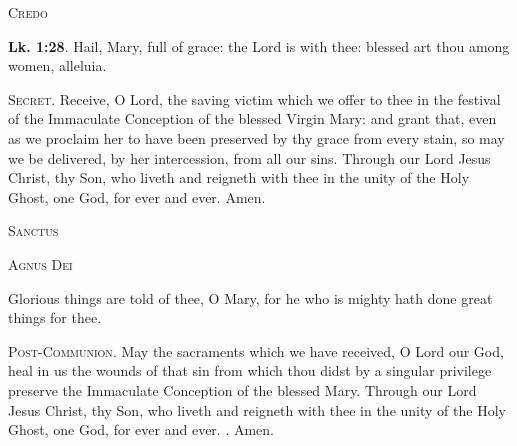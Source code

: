 \documentclass[11pt]{article} %
\begin{document}
\begin{center}\textsc{Credo}\end{center}


\textbf{Lk. 1:28}. Hail, Mary, full of grace: the Lord is with thee: blessed art
thou among women, alleluia.


\vskip10pt

\textsc{Secret}. Receive, O Lord, the saving victim which we offer to thee in
the festival of the Immaculate Conception of the blessed Virgin Mary: and grant
that, even as we proclaim her to have been preserved by thy grace from every
stain, so may we be delivered, by her intercession, from all our sins. Through
our Lord Jesus Christ, thy Son, who liveth and reigneth with thee in the unity
of the Holy Ghost, one God, for ever and ever. Amen.

\begin{center}\textsc{Sanctus}\end{center}
\begin{center}\textsc{Agnus Dei}\end{center}


Glorious things are told of thee, O Mary, for he who is mighty hath done great
things for thee.


\vskip10pt

\textsc{Post-Communion}. May the sacraments which we have received, O Lord our
God, heal in us the wounds of that sin from which thou didst by a singular
privilege preserve the Immaculate Conception of the blessed Mary. Through our
Lord Jesus Christ, thy Son, who liveth and reigneth with thee in the unity of 
the Holy Ghost, one God, for ever and ever. \Rbar{}. Amen.
\end{document}
